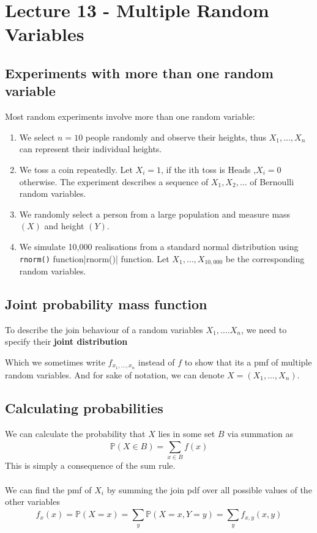 \documentclass{report}
\theoremstyle{definition}
\newtheorem{definition}{Definition}
\theoremstyle{plain}
\theoremstyle{remark}
\begin{document}
\section{Lecture 13 - Multiple Random Variables}
\subsection{Experiments with more than one random variable}
Most random experiments involve more than one random variable:
\begin{enumerate}
  \item We select $ n = 10 $ people randomly and observe their heights, thus
    $ X_1, \dots, X_n $ can represent their individual heights.
  \item We toss a coin repeatedly. Let $ X_i = 1 $, if the ith toss is Heads
    ,$ X_i = 0 $ otherwise. The experiment describes a sequence of $ X_1, X_2, \dots$ of Bernoulli random variables.
  \item We randomly select a person from a large population and measure mass
    $ (X) $ and height $ (Y) $.
  \item We simulate 10,000 realisations from a standard normal distribution
    using \verb|rnorm()| function|rnorm()| function. Let $ X_1, \dots,
    X_{10,000} $ be the corresponding random variables.
\end{enumerate}
\subsection{Joint probability mass function}
To describe the join behaviour of a random variables $ X_1, \dots. X_n $, we
need to specify their \textbf{joint distribution}
\begin{center}
\end{center}
Which we sometimes write $ f_{x_1, \dots, x_n} $ instead of $ f $ to show that
its a pmf of multiple random variables. And for sake of notation, we can denote 
$ X = (X_1, \dots, X_n) $.
\subsection{Calculating probabilities}
We can calculate the probability that $ X $ lies in some set $ B $ via
summation as
$$ \mathbb{P}(X \in B) = \displaystyle \sum_{x \in B}^{} f(x) $$
This is simply a consequence of the sum rule.
\\\\
We can find the pmf of $ X_i $ by summing the join pdf over all possible values
of the other variables
$$ f_x(x) = \mathbb{P} (X=x) = \displaystyle \sum_{y}^{} \mathbb{P} (X=x, Y=y)
= \displaystyle \sum_{y}^{} f_{x,y}(x,y)$$
\end{document}

